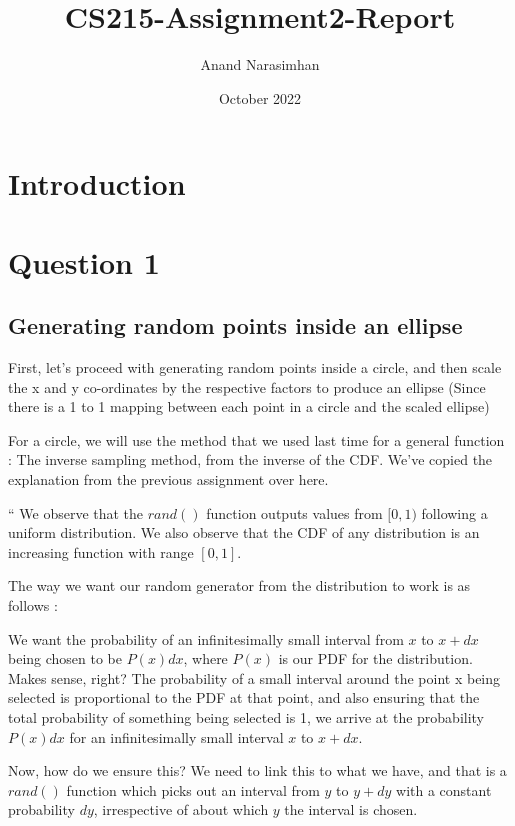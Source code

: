 \documentclass{article}
\title{CS215-Assignment2-Report}
\author{Anand Narasimhan}
\date{October 2022}
\begin{document}
\maketitle

\section{Introduction}

\section{Question 1}

\subsection{Generating random points inside an ellipse}

First, let's proceed with generating random points inside a circle, and then scale the x and y co-ordinates by the respective factors to produce an ellipse (Since there is a 1 to 1 mapping between each point in a circle and the scaled ellipse) 

For a circle, we will use the method that we used last time for a general function : The inverse sampling method, from the inverse of the CDF. We've copied the explanation from the previous assignment over here.

`` We observe that the $rand()$ function outputs values from $[0,1)$ following a uniform distribution. We also observe that the CDF of any distribution is an increasing function with range $[0,1]$. 

The way we want our random generator from the distribution to work is as follows : 

We want the probability of an infinitesimally small interval from $x$ to $x+dx$ being chosen to be $P(x)dx$, where $P(x)$ is our PDF for the distribution. Makes sense, right? The probability of a small interval around the point x being selected is proportional to the PDF at that point, and also ensuring that the total probability of something being selected is 1, we arrive at the probability $P(x)dx$ for an infinitesimally small interval $x$ to $x+dx$.

Now, how do we ensure this? We need to link this to what we have, and that is a $rand()$ function which picks out an interval from $y$ to $y + dy$ with a constant probability $dy$, irrespective of about which $y$ the interval is chosen. 
\end{document}
